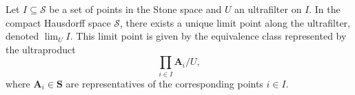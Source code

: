 Let $I \subseteq \mathcal{S}$ be a set of points in the Stone space and $U$ an ultrafilter on $I$. In the compact Hausdorff space $\mathcal{S}$, there exists a unique limit point along the ultrafilter, denoted $\lim_U I$. This limit point is given by the equivalence class represented by the ultraproduct
$$\prod_{i \in I} \mathbf{A}_i / U,$$
where $\mathbf{A}_i \in \mathbf{S}$ are representatives of the corresponding points $i \in I$.
